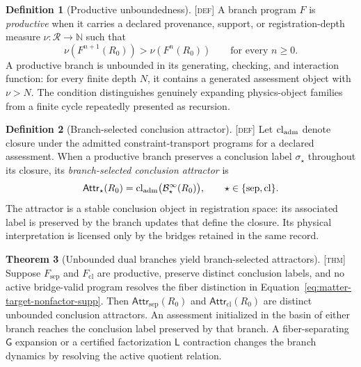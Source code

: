 \documentclass[11pt]{article}
\newcommand{\GOp}{\ensuremath{\mathsf{G}}}
\newcommand{\LOp}{\ensuremath{\mathsf{L}}}
\newcommand{\Defn}{\textsc{[def]}}
\newcommand{\Thm}{\textsc{[thm]}}
\theoremstyle{definition}
\newtheorem{sdefinition}{Definition}
\newtheorem{stheorem}[sdefinition]{Theorem}
\begin{document}
\begin{sdefinition}[Productive unboundedness]
\label{def:productive-unboundedness}
\Defn{} A branch program $F$ is \emph{productive} when it carries a declared
provenance, support, or registration-depth measure
$\nu:\mathcal R\to\mathbb N$ such that
\begin{equation}
\nu(F^{n+1}(R_0))>\nu(F^n(R_0))
\qquad\text{for every }n\geq0.
\label{eq:productive-branch}
\end{equation}
A productive branch is unbounded in its generating, checking, and interaction
function: for every finite depth $N$, it contains a generated assessment object
with $\nu>N$. The condition distinguishes genuinely expanding physics-object
families from a finite cycle repeatedly presented as recursion.
\end{sdefinition}

\begin{sdefinition}[Branch-selected conclusion attractor]
\label{def:branch-attractor}
\Defn{} Let $\operatorname{cl}_{\rm adm}$ denote closure under the admitted
constraint-transport programs for a declared assessment. When a productive branch
preserves a conclusion label $\sigma_\star$ throughout its closure, its
\emph{branch-selected conclusion attractor} is
\begin{equation}
\mathsf{Attr}_{\star}(R_0)=
\operatorname{cl}_{\rm adm}\bigl(\mathcal B^{\infty}_{\star}(R_0)\bigr),
\qquad \star\in\{\mathrm{sep},\mathrm{cl}\}.
\label{eq:branch-attractor}
\end{equation}
The attractor is a stable conclusion object in registration space: its associated
label is preserved by the branch updates that define the closure. Its physical
interpretation is licensed only by the bridges retained in the same record.
\end{sdefinition}

\begin{stheorem}[Unbounded dual branches yield branch-selected attractors]
\label{thm:branch-attractors}
\Thm{} Suppose $F_{\mathrm{sep}}$ and $F_{\mathrm{cl}}$ are productive, preserve
distinct conclusion labels, and no active bridge-valid program resolves the
fiber distinction in Equation~\eqref{eq:matter-target-nonfactor-supp}. Then
$\mathsf{Attr}_{\mathrm{sep}}(R_0)$ and
$\mathsf{Attr}_{\mathrm{cl}}(R_0)$ are distinct unbounded conclusion attractors.
An assessment initialized in the basin of either branch reaches the conclusion
label preserved by that branch. A fiber-separating $\GOp$ expansion or a certified
factorization $\LOp$ contraction changes the branch dynamics by resolving the
active quotient relation.
\end{stheorem}
\end{document}
